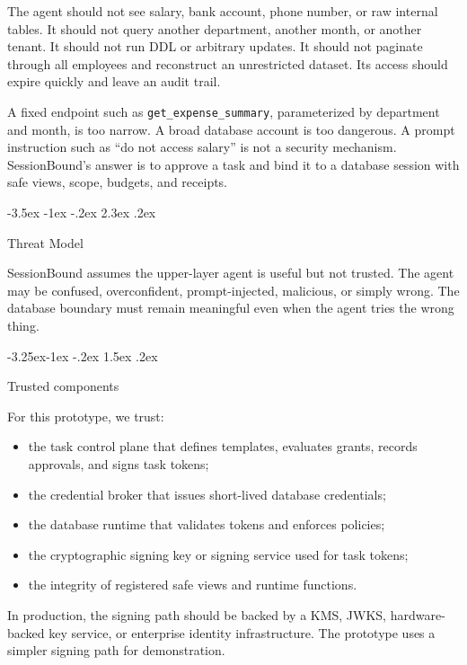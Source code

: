 \documentclass[10pt,twocolumn]{article}
\makeatletter
\providecommand{\tightlist}{%
  \setlength{\itemsep}{0pt}\setlength{\parskip}{0pt}}
\renewcommand\section{\@startsection{section}{1}{\z@}%
  {-3.5ex \@plus -1ex \@minus -.2ex}%
  {2.3ex \@plus .2ex}%
  {\normalfont\Large\bfseries\raggedright}}
\renewcommand\subsection{\@startsection{subsection}{2}{\z@}%
  {-3.25ex\@plus -1ex \@minus -.2ex}%
  {1.5ex \@plus .2ex}%
  {\normalfont\large\bfseries\raggedright}}
\makeatother
\begin{document}
The agent should not see salary, bank account, phone number, or raw
internal tables. It should not query another department, another month,
or another tenant. It should not run DDL or arbitrary updates. It should
not paginate through all employees and reconstruct an unrestricted
dataset. Its access should expire quickly and leave an audit trail.

A fixed endpoint such as \texttt{get\_expense\_summary}, parameterized
by department and month, is too narrow. A broad database account is too
dangerous. A prompt instruction such as ``do not access salary'' is not
a security mechanism. SessionBound's answer is to approve a task and
bind it to a database session with safe views, scope, budgets, and
receipts.


\hypertarget{threat-model}{%
\section{Threat Model}\label{threat-model}}

SessionBound assumes the upper-layer agent is useful but not trusted.
The agent may be confused, overconfident, prompt-injected, malicious, or
simply wrong. The database boundary must remain meaningful even when the
agent tries the wrong thing.

\hypertarget{trusted-components}{%
\subsection{Trusted components}\label{trusted-components}}

For this prototype, we trust:

\begin{itemize}
\tightlist
\item
  the task control plane that defines templates, evaluates grants,
  records approvals, and signs task tokens;
\item
  the credential broker that issues short-lived database credentials;
\item
  the database runtime that validates tokens and enforces policies;
\item
  the cryptographic signing key or signing service used for task tokens;
\item
  the integrity of registered safe views and runtime functions.
\end{itemize}

In production, the signing path should be backed by a KMS, JWKS,
hardware-backed key service, or enterprise identity infrastructure. The
prototype uses a simpler signing path for demonstration.
\end{document}
